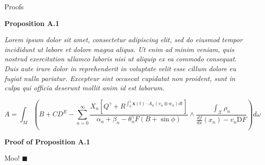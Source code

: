 \documentclass[a4paper]{article}
\newcommand{\Co}[1]{}
\begin{document}
\begin{Huge}Proofs\end{Huge}

\textbf{Proposition A.1}\Co{b}

\textit{Lorem ipsum dolor sit amet, consectetur adipiscing elit, sed do eiusmod tempor incididunt ut labore et dolore magna aliqua. Ut enim ad minim veniam, quis nostrud exercitation ullamco laboris nisi ut aliquip ex ea commodo consequat. Duis aute irure dolor in reprehenderit in voluptate velit esse cillum dolore eu fugiat nulla pariatur. Excepteur sint occaecat cupidatat non proident, sunt in culpa qui officia deserunt mollit anim id est laborum.}\Co{i}

$$A=\int_M{\left(B+CD^E-\sum_{n=0}^\infty\frac{X_n\left[Q^\gamma+R^{\int_0^1\boldsymbol{x}(t)\cdot A_n\left(v_n\otimes w_n\right) dt}\right]}{\alpha_n+\beta_n-\theta_n^\gamma F\left(B+\sin\phi\right)}\land\frac{\int_\mathcal{X}\rho_n}{\frac{df}{dx}\left(x_n\right)-v_n\mathrm{D}F}\right)}d\omega$$

\textbf{Proof of Proposition A.1}\Co{b}

Moo! $\blacksquare$
\end{document}

